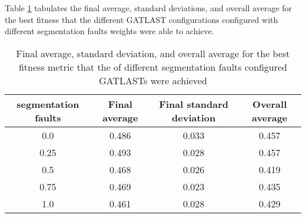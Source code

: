 Table \ref{tab:HP:GA:SegFault:best fitness} tabulates the final average, standard deviations, and overall average for the best fitness that the different GATLAST configurations configured with different segmentation faults weights were able to achieve.
\begin{table}[tbh!]
\centering
\begin{adjustbox}{trim=0cm 0cm 0cm 0cm, clip=true}
\begin{tabular}{|c|c|c|c|}
\hline
segmentation faults & Final average & Final standard deviation & Overall average\\
\hline
0.0 & 0.486 & 0.033 & 0.457\\\hline
0.25 & 0.493 & 0.028 & 0.457\\\hline
0.5 & 0.468 & 0.026 & 0.419\\\hline
0.75 & 0.469 & 0.023 & 0.435\\\hline
1.0 & 0.461 & 0.028 & 0.429\\\hline
\end{tabular}
\end{adjustbox}
\caption{Final average, standard deviation, and overall average for the best fitness metric that the of different segmentation faults configured GATLASTs were achieved}
\label{tab:HP:GA:SegFault:best fitness}
\end{table}
